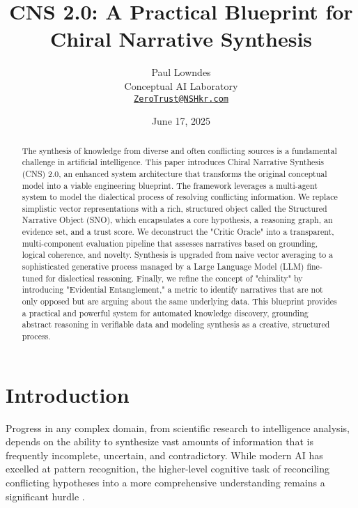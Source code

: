 \documentclass[12pt, a4paper]{article}
\title{\textbf{CNS 2.0: A Practical Blueprint for Chiral Narrative Synthesis}}
\author{
    Paul Lowndes \\
    \small Conceptual AI Laboratory \\
    \small \href{mailto:ZeroTrust@NSHkr.com}{\texttt{ZeroTrust@NSHkr.com}}
}
\date{June 17, 2025}
\begin{document}
\maketitle
\vspace{-2em}

\begin{abstract}
The synthesis of knowledge from diverse and often conflicting sources is a fundamental challenge in artificial intelligence. This paper introduces Chiral Narrative Synthesis (CNS) 2.0, an enhanced system architecture that transforms the original conceptual model into a viable engineering blueprint. The framework leverages a multi-agent system to model the dialectical process of resolving conflicting information. We replace simplistic vector representations with a rich, structured object called the Structured Narrative Object (SNO), which encapsulates a core hypothesis, a reasoning graph, an evidence set, and a trust score. We deconstruct the "Critic Oracle" into a transparent, multi-component evaluation pipeline that assesses narratives based on grounding, logical coherence, and novelty. Synthesis is upgraded from naive vector averaging to a sophisticated generative process managed by a Large Language Model (LLM) fine-tuned for dialectical reasoning. Finally, we refine the concept of "chirality" by introducing "Evidential Entanglement," a metric to identify narratives that are not only opposed but are arguing about the same underlying data. This blueprint provides a practical and powerful system for automated knowledge discovery, grounding abstract reasoning in verifiable data and modeling synthesis as a creative, structured process.
\end{abstract}

\section{Introduction}
Progress in any complex domain, from scientific research to intelligence analysis, depends on the ability to synthesize vast amounts of information that is frequently incomplete, uncertain, and contradictory. While modern AI has excelled at pattern recognition, the higher-level cognitive task of reconciling conflicting hypotheses into a more comprehensive understanding remains a significant hurdle \cite{Boström2017}.
\end{document}

